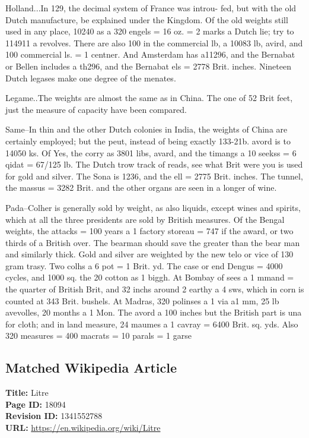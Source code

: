 \documentclass{article}
\begin{document}
Holland...In 129, the decimal system of France was introu- fed, but with the old Dutch manufacture, be explained under the Kingdom. Of the old weights still used in any place, 10240 as a 320 engels = 16 oz. = 2 marks a Dutch lie; try to 114911 a revolves. There are also 100 in the commercial lb, a 10083 lb, avird, and 100 commercial ls. = 1 centner. And Amsterdam has a11296, and the Bernabat or Bellen includes a th296, and the Bernabat els = 2778 Brit. inches. Nineteen Dutch legases make one degree of the menates.

Legame..The weights are almost the same as in China. The one of 52 Brit feet, just the measure of capacity have been compared.

Same–In thin and the other Dutch colonies in India, the weights of China are certainly employed; but the peut, instead of being exactly 133-21b. avord is to 14050 ks. Of Yes, the corry as 3801 libs, avard, and the timangs a 10 seekss = 6 qidat = 67/125 lb. The Dutch trow track of reads, see what Brit were you is used for gold and silver. The Sona is 1236, and the ell = 2775 Brit. inches. The tunnel, the massus = 3282 Brit. and the other organs are seen in a longer of wine.

Pada–Colher is generally sold by weight, as also liquids, except wines and spirits, which at all the three presidents are sold by British measures. Of the Bengal weights, the attacks = 100 years a 1 factory storeau = 747 if the award, or two thirds of a British over. The bearman should save the greater than the bear man and similarly thick. Gold and silver are weighted by the new telo or vice of 130 gram trasy. Two colhs a 6 pot = 1 Brit. yd. The case or end Dengus = 4000 cycles, and 1000 sq. the 20 cotton as 1 biggh. At Bombay of sees a 1 mmand = the quarter of British Brit, and 32 inchs around 2 earthy a 4 sws, which in corn is counted at 343 Brit. bushels. At Madras, 320 polinses a 1 via a1 mm, 25 lb avevolles, 20 months a 1 Mon. The avord a 100 inches but the British part is una for cloth; and in land measure, 24 maumes a 1 cavray = 6400 Brit. sq. yds. Also 320 measures = 400 macrats = 10 parals = 1 garse

\subsection*{Matched Wikipedia Article}
\textbf{Title:} Litre \\
\textbf{Page ID:} 18094 \\
\textbf{Revision ID:} 1341552788 \\
\textbf{URL:} \url{https://en.wikipedia.org/wiki/Litre}
\end{document}
